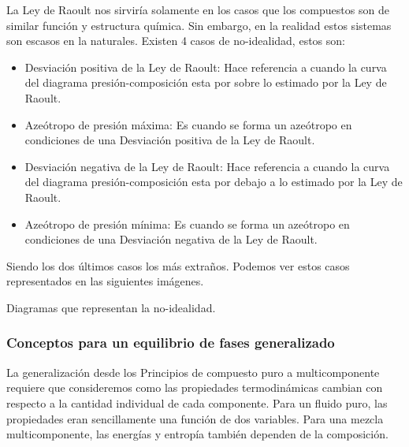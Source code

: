 La Ley de Raoult nos sirviría solamente en los casos que los compuestos son de similar función y estructura química. Sin embargo, en la realidad estos sistemas son escasos en la naturales.
Existen 4 casos de no-idealidad, estos son:
\begin{itemize}
    \item Desviación positiva de la Ley de Raoult: Hace referencia a cuando la curva del diagrama presión-composición esta por sobre lo estimado por la Ley de Raoult.
    \item Azeótropo de presión máxima: Es cuando se forma un azeótropo en condiciones de una Desviación positiva de la Ley de Raoult.
    \item Desviación negativa de la Ley de Raoult: Hace referencia a cuando la curva del diagrama presión-composición esta por debajo a lo estimado por la Ley de Raoult.
    \item Azeótropo de presión mínima: Es cuando se forma un azeótropo en condiciones de una Desviación negativa de la Ley de Raoult.
\end{itemize}

Siendo los dos últimos casos los más extraños. Podemos ver estos casos representados en las siguientes imágenes.

\begin{images}{Diagramas que representan la no-idealidad.}
\end{images}

\subsubsection{Conceptos para un equilibrio de fases generalizado}

La generalización desde los Principios de compuesto puro a multicomponente requiere que consideremos como las propiedades termodinámicas cambian con respecto a la
cantidad individual de cada componente. Para un fluido puro, las propiedades eran sencillamente una función de dos variables. Para una mezcla multicomponente, las energías
y entropía también dependen de la composición.

